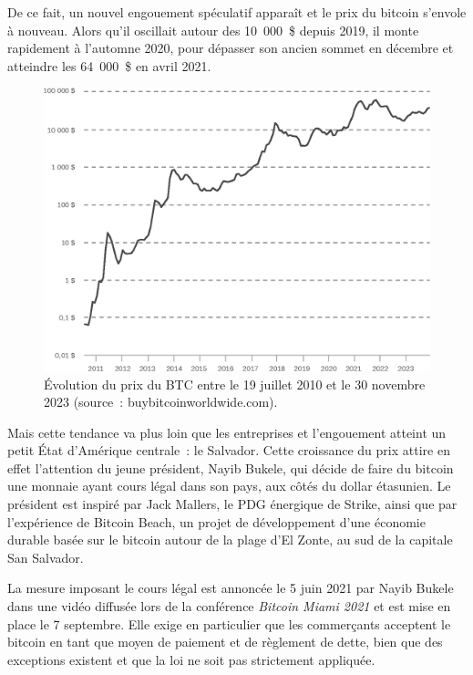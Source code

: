 De ce fait, un nouvel engouement spéculatif apparaît et le prix du bitcoin s'envole à nouveau. Alors qu'il oscillait autour des 10~000~\$ depuis 2019, il monte rapidement à l'automne 2020, pour dépasser son ancien sommet en décembre et atteindre les 64~000~\$ en avril 2021.

\begin{figure}[h]
  \centering
  \includegraphics[scale=0.68]{img/btc-historical-price-20100719-20231130.eps}
  \caption{Évolution du prix du BTC entre le 19 juillet 2010 et le 30 novembre 2023 (source~: buybitcoinworldwide.com).}
  \label{fig:btc-historical-price}
\end{figure}

Mais cette tendance va plus loin que les entreprises et l'engouement atteint un petit État d'Amérique centrale~: le Salvador. Cette croissance du prix attire en effet l'attention du jeune président, Nayib Bukele, qui décide de faire du bitcoin une monnaie ayant cours légal dans son pays, aux côtés du dollar étasunien. Le président est inspiré par Jack Mallers, le PDG énergique de Strike, ainsi que par l'expérience de Bitcoin Beach, un projet de développement d'une économie durable basée sur le bitcoin autour de la plage d'El Zonte, au sud de la capitale San Salvador.

La mesure imposant le cours légal est annoncée le 5 juin 2021 par Nayib Bukele dans une vidéo diffusée lors de la conférence \emph{Bitcoin Miami 2021} et est mise en place le 7 septembre. Elle exige en particulier que les commerçants acceptent le bitcoin en tant que moyen de paiement et de règlement de dette, bien que des exceptions existent et que la loi ne soit pas strictement appliquée.

